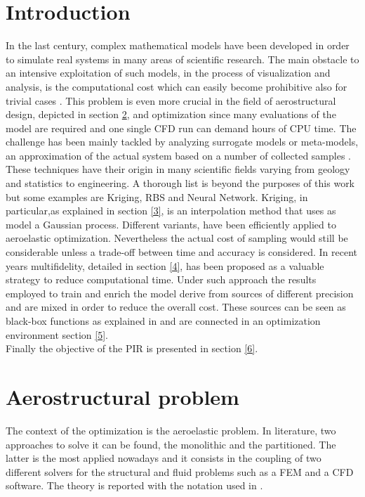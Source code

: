 \documentclass[10pt,twocolumn,a4paper]{scrartcl}
\begin{document}
\section{Introduction}
In the last century, complex mathematical models have been developed in order to simulate real systems in many areas of scientific research. The main obstacle to an intensive exploitation of such models, in the process of visualization and analysis, is the computational cost which can easily become prohibitive also for trivial cases \cite{pc}. This problem is even more crucial in the field of aerostructural design, depicted in section \ref{2},  and optimization since many evaluations of the model are required and one single CFD run can demand hours of CPU time. The challenge has been mainly tackled by analyzing surrogate models or meta-models, an approximation of the actual system based on a number of collected samples \cite{Jones2001}. These techniques have their origin in many scientific fields varying from geology and statistics to engineering. A thorough list is beyond the purposes of this work but some examples are Kriging, RBS and Neural Network. Kriging, in particular,as explained in section \ref{3}, is an interpolation method that uses as model a Gaussian process\cite{surrogate}. Different variants, have been efficiently applied to aeroelastic optimization. Nevertheless the actual cost of sampling would still be considerable unless a trade-off between time and accuracy is considered. In recent years multifidelity, detailed in section \ref{4}, has been proposed as a valuable strategy to reduce computational time. Under such approach the results employed to train and enrich the model derive from sources of different precision and are mixed in order to reduce the overall cost. These sources can be seen as black-box functions as explained in \cite{bbf} and are connected in an optimization environment section \ref{5}.\\ Finally the objective of the PIR is presented in section \ref{6}.

\section{Aerostructural problem}\label{2}
The context of the optimization is the aeroelastic problem. In literature, two approaches to solve it can be found, the monolithic and the partitioned. The latter is the most applied nowadays and it consists in the coupling of two different solvers for the structural and fluid problems such as a FEM and a CFD software. The theory is reported with the notation used in \cite{delft}.
\end{document}
